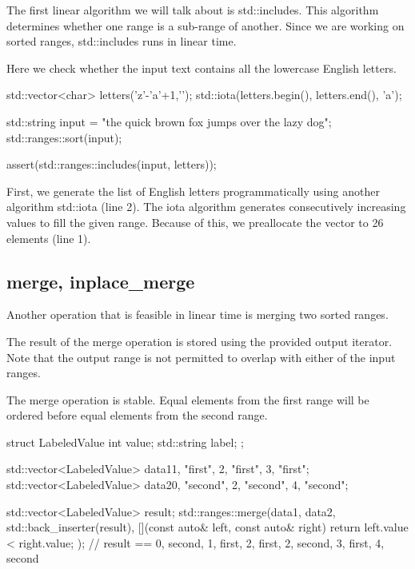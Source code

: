 The first linear algorithm we will talk about is std::includes. This algorithm determines whether one range is a sub-range of another. Since we are working on sorted ranges, std::includes runs in linear time.



Here we check whether the input text contains all the lowercase English letters.

\begin{box-note}
\begin{cppcode}
std::vector<char> letters('z'-'a'+1,'\0');
std::iota(letters.begin(), letters.end(), 'a');

std::string input = "the quick brown fox jumps over the lazy dog";
std::ranges::sort(input);

assert(std::ranges::includes(input, letters));
\end{cppcode}
\end{box-note}

First, we generate the list of English letters programmatically using another algorithm std::iota (line 2). The iota algorithm generates consecutively increasing values to fill the given range. Because of this, we preallocate the vector to 26 elements (line 1).

\subsection{merge, inplace\_merge}

Another operation that is feasible in linear time is merging two sorted ranges.



The result of the merge operation is stored using the provided output iterator. Note that the output range is not permitted to overlap with either of the input ranges.

The merge operation is stable. Equal elements from the first range will be ordered before equal elements from the second range.

\begin{box-note}
\begin{cppcode}
struct LabeledValue {
    int value;
    std::string label;
};

std::vector<LabeledValue> data1{{1, "first"}, {2, "first"}, {3, "first"}};
std::vector<LabeledValue> data2{{0, "second"}, {2, "second"}, {4, "second"}};

std::vector<LabeledValue> result;
std::ranges::merge(data1, data2, std::back_inserter(result),
  [](const auto& left, const auto& right) { return left.value < right.value; });
// result == {0, second}, {1, first}, {2, first}, {2, second}, {3, first}, {4, second}
\end{cppcode}
\end{box-note}

